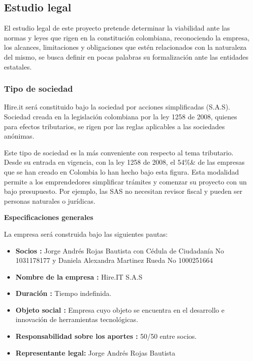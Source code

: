 \subsection{Estudio legal}

El estudio legal de este proyecto pretende determinar la viabilidad ante las normas y leyes que rigen en la constitución colombiana, reconociendo la empresa, los alcances, limitaciones y obligaciones que estén relacionados con la naturaleza del mismo, se busca definir en pocas palabras su formalización ante las entidades estatales.

\subsubsection*{Tipo de sociedad}

Hire.it será constituido bajo la sociedad por acciones simplificadas (S.A.S). Sociedad
creada en la legislación colombiana por la ley 1258 de 2008, quienes para efectos tributarios, se rigen por las reglas aplicables a las sociedades anónimas.

Este tipo de sociedad es la más conveniente con respecto al tema tributario. Desde su entrada en vigencia, con la ley 1258 de 2008, el 54\%& de las empresas que se han creado en Colombia lo han hecho bajo esta figura. Esta modalidad permite a los emprendedores simplificar trámites y comenzar su proyecto con un bajo presupuesto. Por ejemplo, las SAS no necesitan revisor fiscal y pueden ser personas naturales o jurídicas.

\newline
\textbf{Especificaciones generales}
\newline

La empresa será construida bajo las siguientes pautas:

\begin{itemize}
    \item \textbf{Socios : } Jorge Andrés Rojas Bautista con Cédula de Ciudadanía No 1031178177 y Daniela Alexandra Martinez Rueda No 1000251664
    \item \textbf{Nombre de la empresa :} Hire.IT S.A.S
    \item \textbf{Duración :} Tiempo indefinida.
    \item \textbf{Objeto social :} Empresa cuyo objeto se encuentra en el desarrollo e innovación de herramientas tecnológicas.
    \item \textbf{Responsabilidad sobre los aportes :} 50/50 entre socios.
    \item \textbf{Representante legal: } Jorge Andrés Rojas Bautista
\end{itemize}

